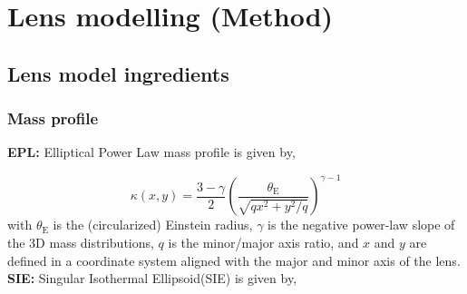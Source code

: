 \documentclass{aa}
\begin{document}
\section{Lens modelling (Method)} \label{sec:modeling_method}

\subsection{Lens model ingredients}

\subsubsection{Mass profile}
\textbf{EPL:} Elliptical Power Law mass profile is given by, 

$$
\kappa\left(x, y\right)=\frac{3-\gamma}{2}\left(\frac{\theta_{\mathrm{E}}}{\sqrt{q x^2+y^2 / q}}\right)^{\gamma-1}
$$
with $\theta_{\mathrm{E}}$ is the (circularized) Einstein radius, $\gamma$ is the negative power-law slope of the 3D mass distributions, $q$ is the minor/major axis ratio, and $x$ and $y$ are defined in a coordinate system aligned with the major and minor axis of the lens.
\\
\newline
\textbf{SIE:} Singular Isothermal Ellipsoid(SIE) is given by,
\end{document}
